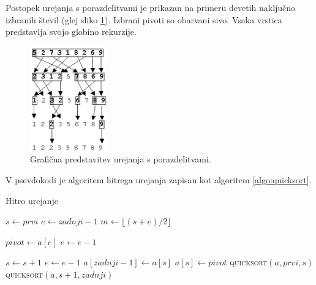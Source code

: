 \documentclass[a4paper,oneside,12pt]{article}
\begin{document}
Postopek urejanja s porazdelitvami je prikazan na primeru devetih naključno
izbranih števil (glej sliko \ref{fig:quicksortimage}). Izbrani pivoti so obarvani sivo.
Vsaka vrstica predstavlja svojo globino rekurzije.

\begin{figure}[h]
    \begin{center}
        \includegraphics[height=45mm]{slike/quicksort.jpg}
    \end{center}
    \vspace{-0.7cm}
    \caption[Hitro urejanje]{Grafična predstavitev urejanja s porazdelitvami.}
    \label{fig:quicksortimage}
\end{figure}

V psevdokodi je algoritem hitrega urejanja zapisan kot algoritem \ref{algo:quicksort}.

\begin{algorithm}
  \caption{Hitro urejanje}\label{algo:quicksort}
  \begin{algorithmic}[1]
         \Return \EndIf
        \State $s \gets prvi$
        \State $e \gets zadnji - 1$
        \State $m \gets \lfloor(s+e)/2\rfloor$
        \EndIf

        \State $pivot \gets a[e]$
        \State $e \gets e - 1$

                \State $s \gets s + 1$
            \EndWhile
                \State $e \gets e - 1$
            \EndWhile
            \EndIf
        \EndWhile
        \State $a[zadnji - 1] \gets a[s]$
        \State $a[s] \gets pivot$
        \State \textsc{quicksort}$(a, prvi, s)$
        \State \textsc{quicksort}$(a, s + 1, zadnji)$
    \EndFunction
  \end{algorithmic}
\end{algorithm}
\end{document}
